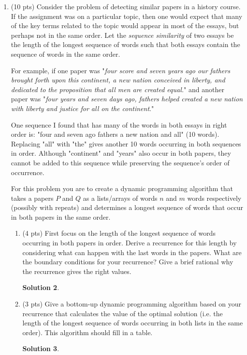 \documentclass[11pt]{article}
\newtheorem*{solution}{Solution}
\begin{document}
\begin{enumerate}
\begin{enumerate}
\begin{solution}
\end{solution}
\newpage
\end{enumerate}



\item (10 pts) 
Consider the problem of detecting similar papers in a history course. 
If the assignment was on a particular topic, then one would expect that many of the key terms related to the topic would appear in most of the essays, but perhaps not in the same order.
Let the \emph{sequence similarity} of two essays be the length of the longest sequence of words such that both essays contain the sequence of words in the same order.

For example, if one paper was "\emph{four score and seven years ago our fathers brought forth upon this continent, a new nation conceived in liberty, and dedicated to the proposition that all men are created equal.}"  and another paper was "\emph{four years and seven days ago, fathers helped created a new nation with liberty and justice for all on the continent}."

One sequence I found that has many of the words in both essays in right order is:
"four and seven ago fathers a new nation and all" (10 words).  Replacing "all" with "the" gives another 10 words occurring in both sequences in order.
Although "continent" and "years" also occur in both papers, they cannot be added to this sequence while preserving the sequence's order of occurrence. 

For this problem you are to create a dynamic programming algorithm that takes a papers $P$ and $Q$ as a lists/arrays of words $n$ and $m$ words respectively (possibly with repeats) and determines a longest sequence of words that occur in both papers in the same order.
\newpage
\begin{enumerate}
\item (4 pts) First focus on the length of the longest sequence of words occurring in both papers in order.
Derive a recurrence for this length by considering what can happen with the last words in the papers.
What are the boundary conditions for your recurrence?
Give a brief rational why the recurrence gives the right values.

\begin{solution}

\end{solution}
\newpage
\item (3 pts) Give a bottom-up dynamic programming algorithm based on your recurrence that calculates the value of the optimal solution (i.e. the length of the longest sequence of words occurring in both lists in the same order).   This algorithm should fill in a table.
\begin{solution}


\end{solution}
\end{enumerate}
\end{enumerate}
\end{document}
